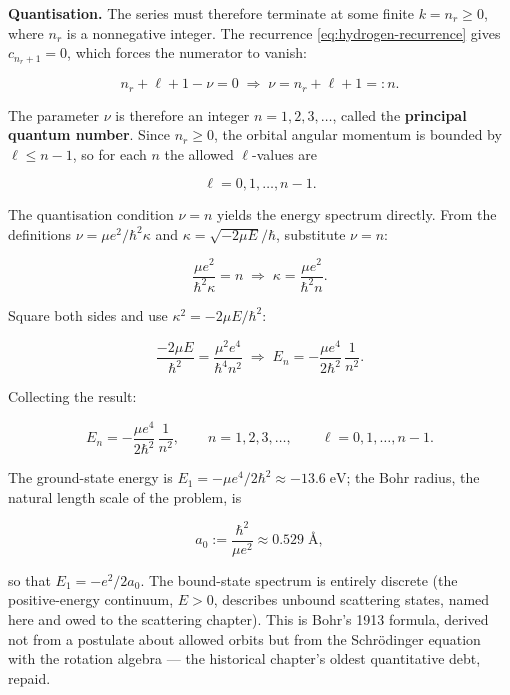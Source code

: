 \medskip\noindent\textbf{Quantisation.} The series must therefore terminate at some finite $k = n_r \ge 0$, where $n_r$ is a nonnegative integer. The recurrence \eqref{eq:hydrogen-recurrence} gives $c_{n_r+1} = 0$, which forces the numerator to vanish:
\begin{linenomath}
\begin{equation}
n_r + \ell + 1 - \nu = 0
\;\Longrightarrow\;
\nu = n_r + \ell + 1 =: n .
\label{eq:hydrogen-quantization}
\end{equation}
\end{linenomath}
The parameter $\nu$ is therefore an integer $n = 1,2,3,\ldots$, called the \textbf{principal quantum number}. Since $n_r \ge 0$, the orbital angular momentum is bounded by $\ell \le n-1$, so for each $n$ the allowed $\ell$-values are
\begin{linenomath}
\begin{equation*}
\ell = 0, 1, \ldots, n-1 .
\end{equation*}
\end{linenomath}
The quantisation condition $\nu = n$ yields the energy spectrum directly. From the definitions $\nu = \mu e^2/\hbar^2\kappa$ and $\kappa = \sqrt{-2\mu E}/\hbar$, substitute $\nu = n$:
\begin{linenomath}
\begin{equation*}
\frac{\mu e^2}{\hbar^2\kappa} = n
\;\Longrightarrow\;
\kappa = \frac{\mu e^2}{\hbar^2 n}.
\end{equation*}
\end{linenomath}
Square both sides and use $\kappa^2 = -2\mu E/\hbar^2$:
\begin{linenomath}
\begin{equation*}
\frac{-2\mu E}{\hbar^2} = \frac{\mu^2 e^4}{\hbar^4 n^2}
\;\Longrightarrow\;
E_n = -\frac{\mu e^4}{2\hbar^2}\,\frac{1}{n^2}.
\end{equation*}
\end{linenomath}
Collecting the result:
\begin{linenomath}
\begin{equation}
\boxed{\;
E_n = -\frac{\mu e^4}{2\hbar^2}\,\frac{1}{n^2},
\qquad n = 1,2,3,\ldots,
\qquad \ell = 0,1,\ldots,n-1 .
\;}
\label{eq:hydrogen-spectrum}
\end{equation}
\end{linenomath}
The ground-state energy is $E_1 = -\mu e^4/2\hbar^2 \approx -13.6\;\text{eV}$; the Bohr radius, the natural length scale of the problem, is
\begin{linenomath}
\begin{equation*}
a_0 := \frac{\hbar^2}{\mu e^2} \approx 0.529\;\text{\AA},
\end{equation*}
\end{linenomath}
so that $E_1 = -e^2/2a_0$. The bound-state spectrum is entirely discrete (the positive-energy continuum, $E>0$, describes unbound scattering states, named here and owed to the scattering chapter). This is Bohr's 1913 formula, derived not from a postulate about allowed orbits but from the Schr\"odinger equation with the rotation algebra --- the historical chapter's oldest quantitative debt, repaid.


